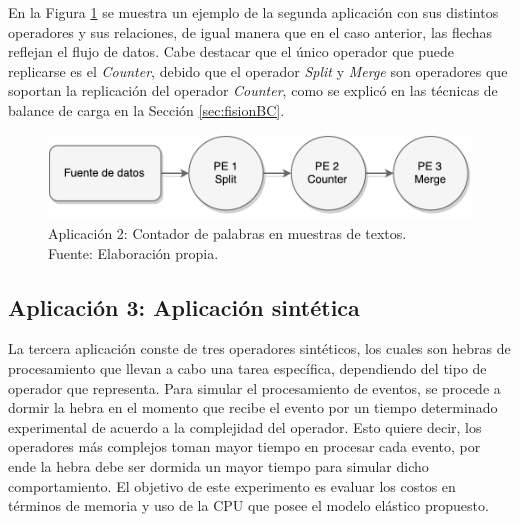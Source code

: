 En la Figura \ref{fig:segundaAplicacion} se muestra un ejemplo de la segunda aplicación con sus distintos operadores y sus relaciones, de igual manera que en el caso anterior, las flechas reflejan el flujo de datos. Cabe destacar que el único operador que puede replicarse es el \textit{Counter}, debido que el operador \textit{Split} y \textit{Merge} son operadores que soportan la replicación del operador \textit{Counter}, como se explicó en las técnicas de balance de carga en la Sección \ref{sec:fisionBC}.

\begin{figure}[!ht]
	\centering
	\captionsetup{justification=centering}
		\includegraphics[scale=0.6]{images/App2.pdf}
	\caption[Aplicación 2: Contador de palabras en muestras de textos.]{Aplicación 2: Contador de palabras en muestras de textos.\\Fuente: Elaboración propia.}
	\label{fig:segundaAplicacion}
\end{figure}

\subsection{Aplicación 3: Aplicación sintética}

La tercera aplicación conste de tres operadores sintéticos, los cuales son hebras de procesamiento que llevan a cabo una tarea específica, dependiendo del tipo de operador que representa. Para simular el procesamiento de eventos, se procede a dormir la hebra en el momento que recibe el evento por un tiempo determinado experimental de acuerdo a la complejidad del operador. Esto quiere decir, los operadores más complejos toman mayor tiempo en procesar cada evento, por ende la hebra debe ser dormida un mayor tiempo para simular dicho comportamiento. El objetivo de este experimento es evaluar los costos en términos de memoria y uso de la CPU que posee el modelo elástico propuesto.

